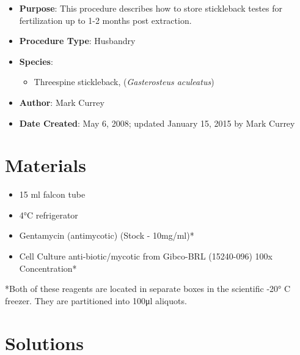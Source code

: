 \documentclass[
  letterpaper,
  DIV=11,
  numbers=noendperiod]{scrreprt}
\providecommand{\tightlist}{%
  \setlength{\itemsep}{0pt}\setlength{\parskip}{0pt}}\usepackage{longtable,booktabs,array}
\begin{document}
\begin{itemize}
\tightlist
\item
  \textbf{Purpose}: This procedure describes how to store stickleback
  testes for fertilization up to 1-2 months post extraction.
\item
  \textbf{Procedure Type}: Husbandry
\item
  \textbf{Species}:

  \begin{itemize}
  \tightlist
  \item
    Threespine stickleback, (\emph{Gasterosteus aculeatus})
  \end{itemize}
\item
  \textbf{Author}: Mark Currey
\item
  \textbf{Date Created}: May 6, 2008; updated January 15, 2015 by Mark
  Currey
\end{itemize}

\hypertarget{materials-50}{%
\section{Materials}\label{materials-50}}

\begin{itemize}
\tightlist
\item
  15 ml falcon tube
\item
  4°C refrigerator
\item
  Gentamycin (antimycotic) (Stock - 10mg/ml)*
\item
  Cell Culture anti-biotic/mycotic from Gibco-BRL (15240-096) 100x
  Concentration*
\end{itemize}

\begin{tcolorbox}[enhanced jigsaw, rightrule=.15mm, title=\textcolor{quarto-callout-warning-color}{\faExclamationTriangle}\hspace{0.5em}{NOTES}, titlerule=0mm, opacitybacktitle=0.6, toprule=.15mm, bottomrule=.15mm, opacityback=0, left=2mm, colframe=quarto-callout-warning-color-frame, breakable, coltitle=black, colback=white, colbacktitle=quarto-callout-warning-color!10!white, bottomtitle=1mm, leftrule=.75mm, toptitle=1mm, arc=.35mm]

*Both of these reagents are located in separate boxes in the scientific
-20° C freezer. They are partitioned into 100μl aliquots.

\end{tcolorbox}

\hypertarget{solutions-41}{%
\section{Solutions}\label{solutions-41}}
\end{document}
